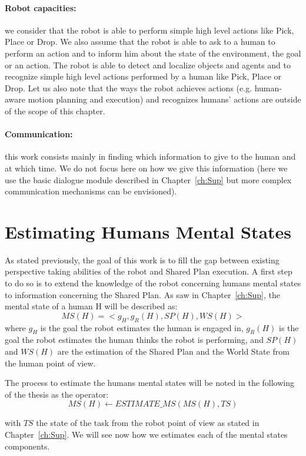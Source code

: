 \documentclass[english,a4paper,11pt,twoside]{StyleThese}
\begin{document}
\paragraph{Robot capacities:} we consider that the robot is able to perform simple high level actions like Pick, Place or Drop. We also assume that the robot is able to ask to a human to perform an action and to inform him about the state of the environment, the goal or an action. The robot is able to detect and localize objects and agents
and to recognize simple high level actions performed by a human like Pick, Place or Drop. Let us also note that the ways the robot achieves actions (e.g. human-aware motion planning and execution) and recognizes humans’ actions are outside of the scope of this chapter.

\paragraph{Communication:} this work consists mainly in finding which information to give to the human and at which time. We do not focus here on how we give this information (here we use the basic dialogue module described in Chapter~\ref{ch:Sup} but more complex communication mechanisms can be envisioned). 

\section{Estimating Humans Mental States}

As stated previously, the goal of this work is to fill the gap between existing perspective taking abilities of the robot and Shared Plan execution. A first step to do so is to extend the knowledge of the robot concerning humans mental states to information concerning the Shared Plan. As saw in Chapter~\ref{ch:Sup}, the mental state of a human H will be described as:
$$MS(H) = <g_H, g_R(H), SP(H), WS(H)>$$
where $g_H$ is the goal the robot estimates the human is engaged in, $g_R(H)$ is the goal the robot estimates the human thinks the robot is performing, and $SP(H)$ and $WS(H)$ are the estimation of the Shared Plan and the World State from the human point of view. 

The process to estimate the humans mental states will be noted in the following of the thesis as the operator:
$$MS(H) \leftarrow ESTIMATE\_MS(MS(H), TS)$$

with $TS$ the state of the task from the robot point of view as stated in Chapter~\ref{ch:Sup}.
We will see now how we estimates each of the mental states components.
\end{document}
